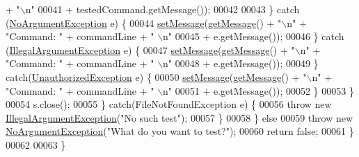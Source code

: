 \begin{DoxyCode}
      + \textcolor{stringliteral}{"\(\backslash\)n"}
00041                                     + testedCommand.getMessage());
00042 
00043                     \} \textcolor{keywordflow}{catch} (\hyperlink{classNoArgumentException}{NoArgumentException} e) \{
00044                         \hyperlink{classCommand_a715709d8f0ab65879d79ad1725c96f17}{setMessage}(\hyperlink{classCommand_ac3d4abebefb2aea0ce9757bf9c356882}{getMessage}() + \textcolor{stringliteral}{"\(\backslash\)n"} + \textcolor{stringliteral}{"Command: "} + commandLine + \textcolor{stringliteral}{"
      \(\backslash\)n"}
00045                                 + e.getMessage());
00046                     \} \textcolor{keywordflow}{catch} (\hyperlink{classIllegalArgumentException}{IllegalArgumentException} e) \{
00047                         \hyperlink{classCommand_a715709d8f0ab65879d79ad1725c96f17}{setMessage}(\hyperlink{classCommand_ac3d4abebefb2aea0ce9757bf9c356882}{getMessage}() + \textcolor{stringliteral}{"\(\backslash\)n"} + \textcolor{stringliteral}{"Command: "} + commandLine + \textcolor{stringliteral}{"
      \(\backslash\)n"}
00048                                 + e.getMessage());
00049                     \} \textcolor{keywordflow}{catch}(\hyperlink{classUnauthorizedException}{UnauthorizedException} e)  \{
00050                         \hyperlink{classCommand_a715709d8f0ab65879d79ad1725c96f17}{setMessage}(\hyperlink{classCommand_ac3d4abebefb2aea0ce9757bf9c356882}{getMessage}() + \textcolor{stringliteral}{"\(\backslash\)n"} + \textcolor{stringliteral}{"Command: "} + commandLine + \textcolor{stringliteral}{"
      \(\backslash\)n"}
00051                                 + e.getMessage());
00052                     \}
00053                 \}
00054                 s.close();
00055             \} \textcolor{keywordflow}{catch}(FileNotFoundException e) \{
00056                 \textcolor{keywordflow}{throw} \textcolor{keyword}{new} \hyperlink{classIllegalArgumentException}{IllegalArgumentException}(\textcolor{stringliteral}{"No such test"});
00057             \}
00058         \} \textcolor{keywordflow}{else}
00059             \textcolor{keywordflow}{throw} \textcolor{keyword}{new} \hyperlink{classNoArgumentException}{NoArgumentException}(\textcolor{stringliteral}{"What do you want to test?"});
00060         \textcolor{keywordflow}{return} \textcolor{keyword}{false};
00061     \}
00062 
00063 \}
\end{DoxyCode}
